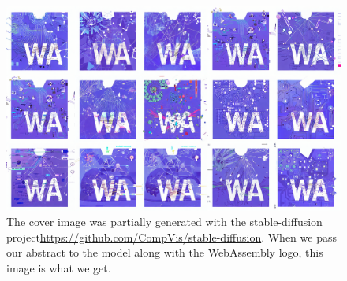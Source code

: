 
{
    \thispagestyle{empty}
    \centering
    \renewcommand\thefigure{for thesis cover}    
    \begin{figure}
        \includegraphics[width=1.2\textwidth]{cover/final.png}
        \caption{The cover image was partially generated with the stable-diffusion project\url{https://github.com/CompVis/stable-diffusion}. When we pass our abstract to the model along with the WebAssembly logo, this image is what we get.
        }
    \end{figure}
}